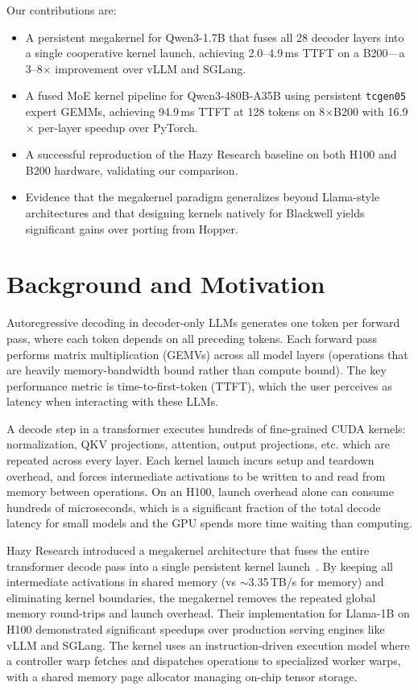 \documentclass[sigplan,screen]{acmart}
\begin{document}
Our contributions are:
\begin{itemize}
  \item A persistent megakernel for Qwen3-1.7B that fuses all 28 decoder layers into a single cooperative kernel launch, achieving 2.0--4.9\,ms TTFT on a B200---a 3--8$\times$ improvement over vLLM and SGLang.
  \item A fused MoE kernel pipeline for Qwen3-480B-A35B using persistent \texttt{tcgen05} expert GEMMs, achieving 94.9\,ms TTFT at 128 tokens on 8$\times$B200 with 16.9$\times$ per-layer speedup over PyTorch.
  \item A successful reproduction of the Hazy Research baseline on both H100 and B200 hardware, validating our comparison.
  \item Evidence that the megakernel paradigm generalizes beyond Llama-style architectures and that designing kernels natively for Blackwell yields significant gains over porting from Hopper.
\end{itemize}

\section{Background and Motivation}

Autoregressive decoding in decoder-only LLMs generates one token per forward pass, where each token depends on all preceding tokens. Each forward pass performs matrix multiplication (GEMVs) across all model layers (operations that are heavily memory-bandwidth bound rather than compute bound). The key performance metric is time-to-first-token (TTFT), which the user perceives as latency when interacting with these LLMs.


A decode step in a transformer executes hundreds of fine-grained CUDA kernels: normalization, QKV projections, attention, output projections, etc. which are repeated across every layer. Each kernel launch incurs setup and teardown overhead, and forces intermediate activations to be written to and read from memory between operations. On an H100, launch overhead alone can consume hundreds of microseconds, which is a significant fraction of the total decode latency for small models and the GPU spends more time waiting than computing.


Hazy Research introduced a megakernel architecture that fuses the entire transformer decode pass into a single persistent kernel launch~\cite{hazyresearch}. By keeping all intermediate activations in shared memory (vs ${\sim}$3.35\,TB/s for memory) and eliminating kernel boundaries, the megakernel removes the repeated global memory round-trips and launch overhead. Their implementation for Llama-1B on H100 demonstrated significant speedups over production serving engines like vLLM and SGLang. The kernel uses an instruction-driven execution model where a controller warp fetches and dispatches operations to specialized worker warps, with a shared memory page allocator managing on-chip tensor storage.
\end{document}
